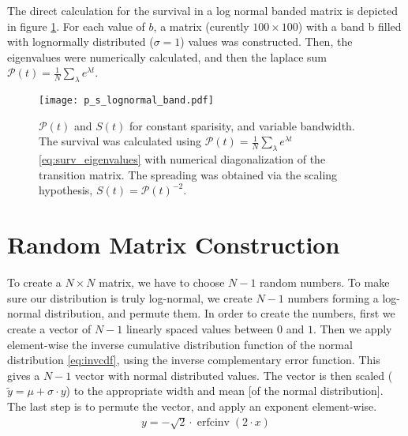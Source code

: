 \documentclass[onecolumn,fleqn]{revtex4}
\begin{document}
The direct calculation for the survival in a log normal banded matrix is depicted in figure \ref{fig:p_s_lognormal_band}. For each value of $b$, a matrix (curently $100
\times 100$) with a band b filled with lognormally distributed ($\sigma=1$) values was constructed. Then, the eigenvalues were numerically calculated, and then the laplace sum $\mathcal{P}(t) =\frac{1}{N}\sum_\lambda e^{\lambda t}$.
\begin{figure}
\texttt{[image: p\_s\_lognormal\_band.pdf]}
\caption{$\mathcal{P}(t)$ and $S(t)$ for constant sparisity, and variable bandwidth. The survival was calculated using $\mathcal{P}(t) =\frac{1}{N}\sum_\lambda e^{\lambda t}$ \eqref{eq:surv_eigenvalues} with numerical diagonalization of the transition matrix. The spreading was obtained via the scaling hypothesis, $S(t) = \mathcal{P}(t)^{-2}$.
}
\label{fig:p_s_lognormal_band}
\end{figure}


\section{Random Matrix Construction}\label{sec:matrix_construction}
To create a $N\times N$ matrix, we have to choose $N-1$ random numbers. To make sure our distribution is truly log-normal, we create $N-1$ numbers forming a log-normal distribution, and permute them. In order to create the numbers, first we create a vector of $N-1$ linearly spaced values between $0$ and $1$. Then we apply element-wise the inverse cumulative distribution function of the normal distribution \ref{eq:invcdf}, using the inverse complementary error function. This gives a $N-1$ vector with normal distributed values. The vector is then scaled ($\tilde{y} = \mu+\sigma\cdot y$) to the appropriate width and mean [of the normal distribution]. The last step is to permute the vector, and apply an exponent element-wise.
\begin{align}\label{eq:invcdf}
y = -\sqrt{2}\cdot\operatorname{erfcinv}(2\cdot x) 
\end{align}



\end{document}
